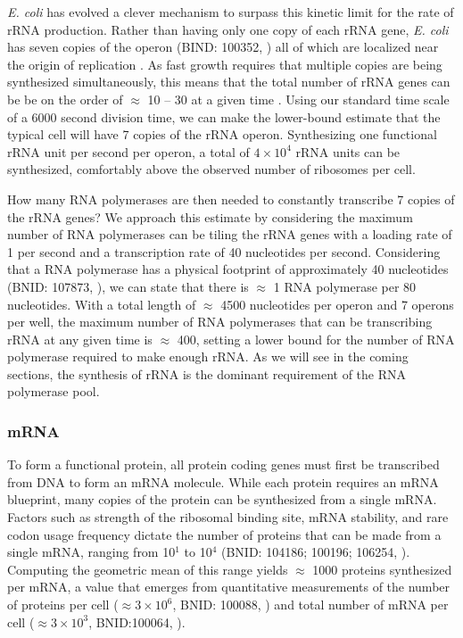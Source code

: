 \textit{E. coli} has evolved a clever mechanism to surpass this kinetic limit
for the rate of rRNA production. Rather than having only one copy of each
rRNA gene, \textit{E. coli} has seven copies of the operon (BIND: 100352,
\cite{milo2010}) all of which are localized near the origin of replication
\citep{birnbaum1971}. As fast growth requires that multiple copies are being
synthesized simultaneously, this means that the total number of rRNA genes
can be be on the order of $\approx$ 10 -- 30 at a given time
\citep{stevenson2004}. Using our standard time scale of a 6000 second
division time, we can make the lower-bound estimate that the typical cell
will have 7 copies of the rRNA operon. Synthesizing one functional rRNA unit
per second per operon, a total of $4 \times 10^4$ rRNA units can be
synthesized, comfortably above the observed number of ribosomes per cell.

How many RNA polymerases are then needed to constantly transcribe 7 copies of
the rRNA genes? We approach this estimate by considering the maximum number
of RNA polymerases can be tiling the rRNA genes with a loading rate of 1 per
second and a transcription rate of 40 nucleotides per second. Considering
that a RNA polymerase has a physical footprint of approximately 40
nucleotides (BNID: 107873, \cite{milo2010}), we can state that there is
$\approx$ 1 RNA polymerase per 80 nucleotides. With a total length of
$\approx$ 4500 nucleotides per operon and 7 operons per well, the maximum
number of RNA polymerases that can be transcribing rRNA at any given time is
$\approx$ 400, setting a lower bound for the number of RNA polymerase
required to make enough rRNA. As we will see in the coming sections, the
synthesis of rRNA is the dominant requirement of the RNA polymerase pool.

\subsubsection{mRNA}
To form a functional protein, all protein coding genes must first be
transcribed from DNA to form an mRNA molecule. While each protein requires an
mRNA blueprint, many copies of the protein can be synthesized from a single
mRNA. Factors such as strength of the ribosomal binding site, mRNA stability,
and rare codon usage frequency dictate the number of proteins that can be
made from a single mRNA, ranging from 10$^1$ to 10$^4$ (BNID: 104186; 100196;
106254, \cite{milo2010}). Computing the geometric mean of this range yields
$\approx$ 1000 proteins synthesized per mRNA, a value that emerges from
quantitative measurements of the number of proteins per cell ($\approx 3
\times 10^6$, BNID: 100088, \cite{milo2010}) and total number of mRNA per
cell ($\approx 3 \times 10^3$, BNID:100064, \cite{milo2010}).  

